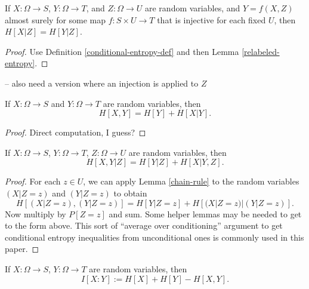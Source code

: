 \begin{lemma}\label{relabeled-entropy-cond}
  If $X: \Omega \to S$, $Y: \Omega \to T$, and $Z: \Omega \to U$ are random variables, and $Y = f(X,Z)$ almost surely for some map $f: S \times U \to T$ that is injective for each fixed $U$, then $H[X|Z] = H[Y|Z]$.
\end{lemma}

\begin{proof}
  \leanok
  Use Definition \ref{conditional-entropy-def} and then Lemma \ref{relabeled-entropy}.
\end{proof}
-- also need a version where an injection is applied to $Z$


\begin{lemma}\label{chain-rule}
  \leanok
  If $X: \Omega \to S$ and $Y: \Omega \to T$ are random variables, then
  $$ H[X, Y] = H[Y] + H[X|Y].$$
  \end{lemma}
  \begin{proof}
  \leanok
  Direct computation, I guess?
\end{proof}

\begin{lemma}\label{conditional-chain-rule}
  If $X: \Omega \to S$, $Y: \Omega \to T$, $Z: \Omega \to U$ are random variables, then
$$ H[X, Y | Z ] = H[Y | Z] + H[X|Y, Z].$$
\end{lemma}

\begin{proof}   For each $z \in U$, we can apply Lemma \ref{chain-rule} to the random variables $(X|Z=z)$ and $(Y|Z=z)$ to obtain
  $$ H[ (X|Z=z),(Y|Z=z) ] = H[Y|Z=z] + H[(X|Z=z)|(Y|Z=z)].$$
  Now multiply by $P[Z=z]$ and sum.  Some helper lemmas may be needed to get to the form above.  This sort of ``average over conditioning'' argument to get conditional entropy inequalities from unconditional ones is commonly used in this paper.
\end{proof}

\begin{definition}
  \label{information-def}
  \leanok
  If $X: \Omega \to S$, $Y: \Omega \to T$ are random variables, then
  $$I[X : Y] := H[X] + H[Y] - H[X,Y].$$
\end{definition}

